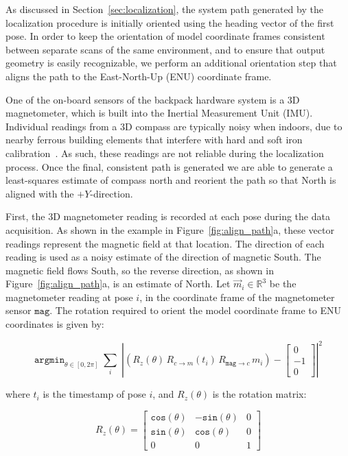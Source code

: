 \documentclass[12pt,onecolumn,oneside]{book}
\begin{document}
As discussed in Section~\ref{sec:localization}, the system path generated by the localization procedure is initially oriented using the heading vector of the first pose.  In order to keep the orientation of model coordinate frames consistent between separate scans of the same environment, and to ensure that output geometry is easily recognizable, we perform an additional orientation step that aligns the path to the East-North-Up (ENU) coordinate frame.

One of the on-board sensors of the backpack hardware system is a 3D magnetometer, which is built into the Inertial Measurement Unit (IMU).  Individual readings from a 3D compass are typically noisy when indoors, due to nearby ferrous building elements that interfere with hard and soft iron calibration~\cite{Caruso00,Guo08}.  As such, these readings are not reliable during the localization process.  Once the final, consistent path is generated we are able to generate a least-squares estimate of compass north and reorient the path so that North is aligned with the $+Y$-direction.

First, the 3D magnetometer reading is recorded at each pose during the data acquisition.  As shown in the example in Figure~\ref{fig:align_path}a, these vector readings represent the magnetic field at that location.  The direction of each reading is used as a noisy estimate of the direction of magnetic South.  The magnetic field flows South, so the reverse direction, as shown in Figure~\ref{fig:align_path}a, is an estimate of North.  Let $\vec{m}_i \in \mathbb{R}^3$ be the magnetometer reading at pose $i$, in the coordinate frame of the magnetometer sensor $\texttt{mag}$.  The rotation required to orient the model coordinate frame to ENU coordinates is given by:

\begin{equation}
	\label{eq:align_path}
	\texttt{argmin}_{\theta \in [0,2\pi]} \; \sum \limits_{i} 
		\; \left| \left( R_{z}(\theta) \, R_{c\rightarrow m} (t_i) \,
			R_{\texttt{mag} \rightarrow c} \, m_i \right) - \left[ 
				\begin{array}{c} 0 \\ -1 \\ 0 \end{array} 
					\right] \right|^2
\end{equation}

where $t_i$ is the timestamp of pose $i$, and $R_{z}(\theta)$ is the rotation matrix:

\begin{equation}
	\label{eq:rotation_matrix}
	R_{z}(\theta) = \left[ \begin{array}{ccc}
				\texttt{cos}(\theta) & -\texttt{sin}(\theta) & 0 \\
				\texttt{sin}(\theta) & \texttt{cos}(\theta) & 0 \\
				0 & 0 & 1 \end{array} \right]
\end{equation}
\end{document}
